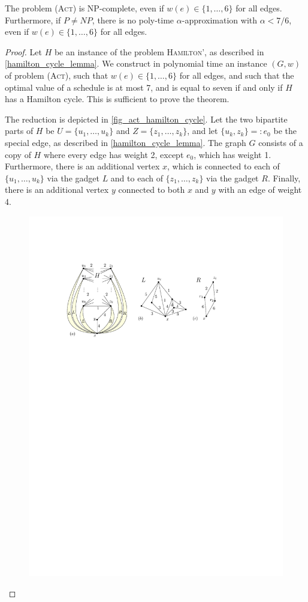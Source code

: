 \documentclass[runningheads]{llncs}
\numberwithin{equation}{section}
\newcommand{\set}[1]{\{ #1 \}}
\newcommand{\fromto}[2]{\set{#1, \ldots, #2}}
\newcommand{\act}{\textsc{(Act)}}
\begin{document}
\begin{theorem}
\label{corollary_act_no_approx}
The problem {\act} is NP-complete, even if $w(e) \in \fromto{1}{6}$ for all edges. Furthermore, if $P \neq NP$, there is no poly-time $\alpha$-approximation with $\alpha < 7/6$, even if $w(e) \in \fromto{1}{6}$ for all edges.
\end{theorem}
\begin{proof}
Let $H$ be an instance of the problem \textsc{Hamilton'}, as described in \cref{hamilton_cycle_lemma}. We construct in polynomial time an instance $(G, w)$ of problem {\act}, such that $w(e) \in \fromto{1}{6}$ for all edges, and such that the optimal value of a schedule is at most 7, and is equal to seven if and only if $H$ has a Hamilton cycle. This is sufficient to prove the theorem.

The reduction is depicted in \cref{fig_act_hamilton_cycle}. Let the two bipartite parts of $H$ be $U = \fromto{u_1}{u_k}$ and $Z = \fromto{z_1}{z_k}$, and let $\set{u_k, z_k} =: e_0$ be the special edge, as described in \cref{hamilton_cycle_lemma}. The graph $G$ consists of a copy of $H$ where every edge has weight 2, except $e_0$, which has weight 1. Furthermore, there is an additional vertex $x$, which is connected to each of $\fromto{u_1}{u_k}$ via the gadget $L$ and to each of $\fromto{z_1}{z_k}$ via the gadget $R$. Finally, there is an additional vertex $y$ connected to both $x$ and $y$ with an edge of weight 4.
\begin{figure}[htpb]
\centering
\includegraphics[scale=1]{img/act-hamilton-cycle}

\end{figure}
\end{proof}
\end{document}
